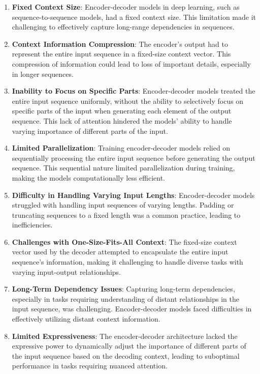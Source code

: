 \documentclass{report}
\begin{document}
\begin{enumerate}
    \item \textbf{Fixed Context Size}: Encoder-decoder models in deep learning, such as sequence-to-sequence models, had a fixed context size. This limitation made it challenging to effectively capture long-range dependencies in sequences.

    \item \textbf{Context Information Compression}: The encoder's output had to represent the entire input sequence in a fixed-size context vector. This compression of information could lead to loss of important details, especially in longer sequences.

    \item \textbf{Inability to Focus on Specific Parts}: Encoder-decoder models treated the entire input sequence uniformly, without the ability to selectively focus on specific parts of the input when generating each element of the output sequence. This lack of attention hindered the models' ability to handle varying importance of different parts of the input.

    \item \textbf{Limited Parallelization}: Training encoder-decoder models relied on sequentially processing the entire input sequence before generating the output sequence. This sequential nature limited parallelization during training, making the models computationally less efficient.

    \item \textbf{Difficulty in Handling Varying Input Lengths}: Encoder-decoder models struggled with handling input sequences of varying lengths. Padding or truncating sequences to a fixed length was a common practice, leading to inefficiencies.

    \item \textbf{Challenges with One-Size-Fits-All Context}: The fixed-size context vector used by the decoder attempted to encapsulate the entire input sequence's information, making it challenging to handle diverse tasks with varying input-output relationships.

    \item \textbf{Long-Term Dependency Issues}: Capturing long-term dependencies, especially in tasks requiring understanding of distant relationships in the input sequence, was challenging. Encoder-decoder models faced difficulties in effectively utilizing distant context information.

    \item \textbf{Limited Expressiveness}: The encoder-decoder architecture lacked the expressive power to dynamically adjust the importance of different parts of the input sequence based on the decoding context, leading to suboptimal performance in tasks requiring nuanced attention.
\end{enumerate}
\end{document}
